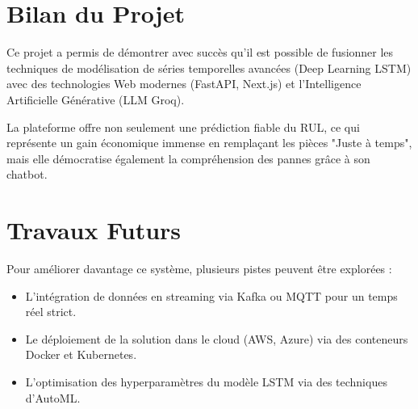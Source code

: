 \documentclass[12pt,a4paper]{report}
\begin{document}
\section{Bilan du Projet}
Ce projet a permis de démontrer avec succès qu'il est possible de fusionner les techniques de modélisation de séries temporelles avancées (Deep Learning LSTM) avec des technologies Web modernes (FastAPI, Next.js) et l'Intelligence Artificielle Générative (LLM Groq). 

La plateforme offre non seulement une prédiction fiable du RUL, ce qui représente un gain économique immense en remplaçant les pièces "Juste à temps", mais elle démocratise également la compréhension des pannes grâce à son chatbot.

\section{Travaux Futurs}
Pour améliorer davantage ce système, plusieurs pistes peuvent être explorées :
\begin{itemize}
    \item L'intégration de données en streaming via Kafka ou MQTT pour un temps réel strict.
    \item Le déploiement de la solution dans le cloud (AWS, Azure) via des conteneurs Docker et Kubernetes.
    \item L'optimisation des hyperparamètres du modèle LSTM via des techniques d'AutoML.
\end{itemize}

\end{document}
